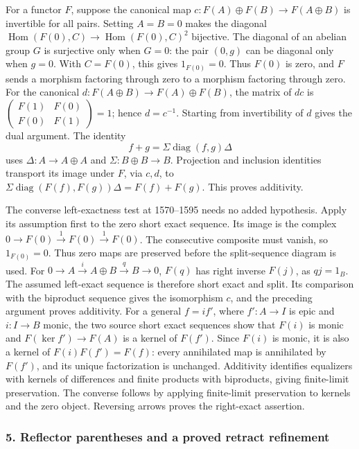 \documentclass[11pt]{article}
\begin{document}
For a functor \(F\), suppose the canonical map \(c:F(A)\oplus F(B)\to F(A\oplus B)\) is invertible for all pairs. Setting \(A=B=0\) makes the diagonal \(\operatorname{Hom}(F(0),C)\to\operatorname{Hom}(F(0),C)^2\) bijective. The diagonal of an abelian group \(G\) is surjective only when \(G=0\): the pair \((0,g)\) can be diagonal only when \(g=0\). With \(C=F(0)\), this gives \(1_{F(0)}=0\). Thus \(F(0)\) is zero, and \(F\) sends a morphism factoring through zero to a morphism factoring through zero. For the canonical \(d:F(A\oplus B)\to F(A)\oplus F(B)\), the matrix of \(dc\) is \(\left(\begin{smallmatrix}F(1)&F(0)\\F(0)&F(1)\end{smallmatrix}\right)=1\); hence \(d=c^{-1}\). Starting from invertibility of \(d\) gives the dual argument. The identity \[
f+g=\Sigma\operatorname{diag}(f,g)\Delta
\] uses \(\Delta:A\to A\oplus A\) and \(\Sigma:B\oplus B\to B\). Projection and inclusion identities transport its image under \(F\), via \(c,d\), to \(\Sigma\operatorname{diag}(F(f),F(g))\Delta=F(f)+F(g)\). This proves additivity.

The converse left-exactness test at 1570--1595 needs no added hypothesis. Apply its assumption first to the zero short exact sequence. Its image is the complex \(0\to F(0)\xrightarrow1 F(0)\xrightarrow1 F(0)\). The consecutive composite must vanish, so \(1_{F(0)}=0\). Thus zero maps are preserved before the split-sequence diagram is used. For \(0\to A\xrightarrow i A\oplus B\xrightarrow q B\to0\), \(F(q)\) has right inverse \(F(j)\), as \(qj=1_B\). The assumed left-exact sequence is therefore short exact and split. Its comparison with the biproduct sequence gives the isomorphism \(c\), and the preceding argument proves additivity. For a general \(f=i f'\), where \(f':A\to I\) is epic and \(i:I\to B\) monic, the two source short exact sequences show that \(F(i)\) is monic and \(F(\ker f')\to F(A)\) is a kernel of \(F(f')\). Since \(F(i)\) is monic, it is also a kernel of \(F(i)F(f')=F(f)\): every annihilated map is annihilated by \(F(f')\), and its unique factorization is unchanged. Additivity identifies equalizers with kernels of differences and finite products with biproducts, giving finite-limit preservation. The converse follows by applying finite-limit preservation to kernels and the zero object. Reversing arrows proves the right-exact assertion.

\subsubsection{5. Reflector parentheses and a proved retract refinement}\label{reflector-parentheses-and-a-proved-retract-refinement}
\end{document}
